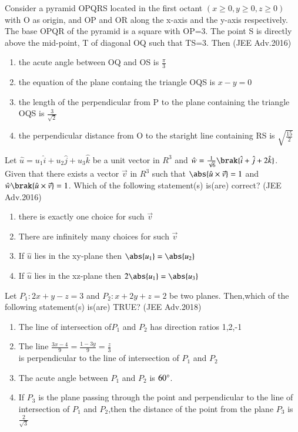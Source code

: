 	\item Consider a pyramid OPQRS located in the first octant $(x\geq 0,y\geq 0,z\geq 0)$ with O as origin, and OP and OR along the x-axis and the y-axis respectively. The base OPQR of the pyramid is
		a square with OP=3. The point S is directly above the mid-point, T of diagonal OQ such that TS=3. Then \hfill{(JEE Adv.2016)}
		\begin{enumerate}
			\item the acute angle between OQ and OS is $\frac{\pi}{3}$
			\item the equation of the plane containg the triangle OQS is $x-y=0$
			\item the length of the perpendicular from P to the plane containing the triangle OQS is $\frac{3}{\sqrt{2}}$
			\item the perpendicular distance from O to the staright line containing RS is $\sqrt{\frac{15}{2}}$
		\end{enumerate}
	\item Let $\hat{u}=u_1\hat{i}+u_2\hat{j}+u_3\hat{k}$ be a unit vector in $R^3$ and $\hat{w}=\frac{1}{\sqrt{6}}\brak{\hat{i}+\hat{j}+2\hat{k}}$. Given that there exists a vector $\vec{v}$ in $R^3$ 
		such that $\abs{\hat{u} \times \vec{v}}=1$ and $\hat{w}\brak{\hat{u}\times \vec{v}}=1$. Which of the following statement(s) is(are) correct? \hfill{(JEE Adv.2016)}
		\begin{enumerate}
			\item there is exactly one choice for such $\vec{v}$
			\item There are infinitely many choices for such $\vec{v}$
			\item If $\hat{u}$ lies in the xy-plane then $\abs{u_1}= \abs{u_2}$
			\item If $\hat{u}$ lies in the xz-plane then $2\abs{u_1}=\abs{u_3}$
		\end{enumerate}
	\item Let $P_1:2x+y-z=3$ and $P_2:x+2y+z=2$ be two planes. Then,which of the following statement(s) is(are) TRUE? \hfill{(JEE Adv.2018)}
		\begin{enumerate}
			\item The line of intersection of$P_1$ and $P_2$ has direction ratios 1,2,-1
			\item The line $\frac{3x-4}{9}=\frac{1-3y}{9}=\frac{z}{3}$ \\ is perpendicular to the line of intersection of $P_1$ and $P_2$
			\item The acute angle between $P_1$ and $P_2$ is $60\degree$.
			\item If $P_3$ is the plane passing through the point  and perpendicular to the line of intersection of $P_1$ and $P_2$,then the distance of the point 
				from the plane $P_3$ is $\frac{2}{\sqrt{3}}$
		\end{enumerate}
